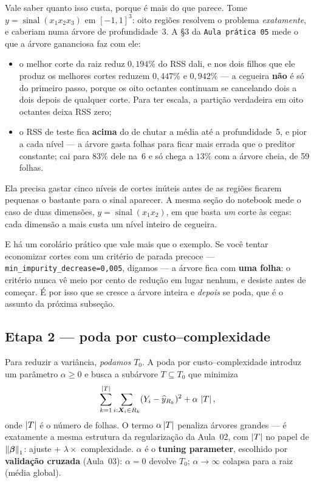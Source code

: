 \documentclass[11pt,a4paper]{article}
\begin{document}
\begin{observacao}\label{obs:miopia}
Vale saber quanto isso custa, porque é mais do que parece. Tome
$y=\operatorname{sinal}(x_1x_2x_3)$ em $[-1,1]^3$: oito regiões resolvem o problema
\emph{exatamente}, e caberiam numa árvore de profundidade~3. A §3 da \texttt{Aula
prática 05} mede o que a árvore gananciosa faz com ele:

\begin{itemize}[leftmargin=1.2cm,nosep]
  \item o melhor corte da raiz reduz $0{,}194\%$ do RSS dali, e nos dois filhos que
        ele produz os melhores cortes reduzem $0{,}447\%$ e $0{,}942\%$ --- a cegueira
        \textbf{não} é só do primeiro passo, porque os oito octantes continuam se
        cancelando dois a dois depois de qualquer corte. Para ter escala, a partição
        verdadeira em oito octantes deixa RSS zero;
  \item o RSS de teste fica \textbf{acima} do de chutar a média até a
        profundidade~5, e pior a cada nível --- a árvore gasta folhas para ficar
        mais errada que o preditor constante; cai para $83\%$ dele na~6 e só chega
        a $13\%$ com a árvore cheia, de 59 folhas.
\end{itemize}

Ela precisa gastar cinco níveis de cortes inúteis antes de as regiões ficarem
pequenas o bastante para o sinal aparecer. A mesma seção do notebook mede o caso de
duas dimensões, $y=\operatorname{sinal}(x_1x_2)$, em que basta \emph{um} corte às
cegas: cada dimensão a mais custa um nível inteiro de cegueira.

E há um corolário prático que vale mais que o exemplo. Se você tentar economizar
cortes com um critério de parada precoce --- \texttt{min\_impurity\_decrease=0,005},
digamos --- a árvore fica com \textbf{uma folha}: o critério nunca vê meio por cento
de redução em lugar nenhum, e desiste antes de começar. É por isso que se cresce a
árvore inteira e \emph{depois} se poda, que é o assunto da próxima subseção.
\end{observacao}

\subsection{Etapa 2 --- poda por custo--complexidade}
Para reduzir a variância, \emph{podamos} $T_0$. A poda por custo--complexidade
introduz um parâmetro $\alpha\ge 0$ e busca a subárvore $T\subseteq T_0$ que
minimiza
\begin{equation}\label{eq:poda}
  \sum_{k=1}^{\left\lvert T \right\rvert}\sum_{i:\bm{X}_i\in R_k}(Y_i-\widehat y_{R_k})^2
   + \alpha\,\left\lvert T \right\rvert,
\end{equation}
onde $\left\lvert T \right\rvert$ é o número de folhas. O termo $\alpha\left\lvert T \right\rvert$ penaliza árvores
grandes --- é exatamente a mesma estrutura da regularização da Aula~02, com
$\left\lvert T \right\rvert$ no papel de $\left\lVert \bm{\beta} \right\rVert_1$: ajuste $+$ $\lambda\times$ complexidade.
$\alpha$ é o \textbf{tuning parameter}, escolhido por \textbf{validação cruzada}
(Aula~03): $\alpha=0$ devolve $T_0$; $\alpha\to\infty$ colapsa para a raiz
(média global).
\end{document}
